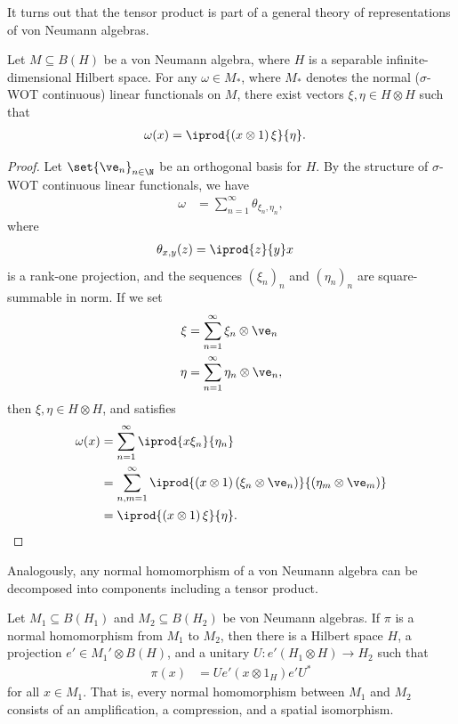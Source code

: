 \documentclass[10pt]{mypackage}
\begin{document}
It turns out that the tensor product is part of a general theory of representations of von Neumann algebras.
\begin{lemma}
  Let $M\subseteq B(H)$ be a von Neumann algebra, where $H$ is a separable infinite-dimensional Hilbert space. For any $\omega\in M_{\ast}$, where $M_{\ast}$ denotes the normal ($\sigma$-WOT continuous) linear functionals on $M$, there exist vectors $\xi,\eta\in H\otimes H$ such that
  \begin{align*}
    \omega(x) &= \iprod{\left( x\otimes 1 \right)\xi}{\eta}.
  \end{align*}
\end{lemma}
\begin{proof}
  Let $\set{\ve_n}_{n\in \N}$ be an orthogonal basis for $H$. By the structure of $\sigma$-WOT continuous linear functionals, we have
  \begin{align*}
    \omega &= \sum_{n=1}^{\infty} \theta_{\xi_n,\eta_n},
  \end{align*}
  where
  \begin{align*}
    \theta_{x,y}(z) &= \iprod{z}{y}x
  \end{align*}
  is a rank-one projection, and the sequences $\left( \xi_n \right)_n$ and $\left( \eta_n \right)_n$ are square-summable in norm. If we set
  \begin{align*}
    \xi &= \sum_{n=1}^{\infty} \xi_n\otimes \ve_n\\
    \eta &= \sum_{n=1}^{\infty}\eta_n\otimes \ve_n,
  \end{align*}
  then $\xi,\eta\in H\otimes H$, and satisfies
  \begin{align*}
    \omega(x) &= \sum_{n=1}^{\infty} \iprod{x\xi_n}{\eta_n}\\
              &= \sum_{n,m=1}^{\infty} \iprod{\left( x\otimes 1 \right)\left( \xi_n\otimes\ve_n \right)}{\left( \eta_m\otimes \ve_m \right)}\\
              &= \iprod{\left( x\otimes 1 \right)\xi}{\eta}.
  \end{align*}
\end{proof}
Analogously, any normal homomorphism of a von Neumann algebra can be decomposed into components including a tensor product.
\begin{theorem}
  Let $M_1\subseteq B\left( H_1 \right)$ and $M_2\subseteq B\left( H_2 \right)$ be von Neumann algebras. If $\pi$ is a normal homomorphism from $M_1$ to $M_2$, then there is a Hilbert space $H$, a projection $e'\in M_1'\otimes B\left( H \right)$, and a unitary $U\colon e'\left( H_1\otimes H \right)\rightarrow H_2$ such that
  \begin{align*}
    \pi(x) &= U e'\left( x\otimes 1_{H} \right)e'U^{\ast}
  \end{align*}
  for all $x\in M_1$. That is, every normal homomorphism between $M_1$ and $M_2$ consists of an amplification, a compression, and a spatial isomorphism.
\end{theorem}
\end{document}
